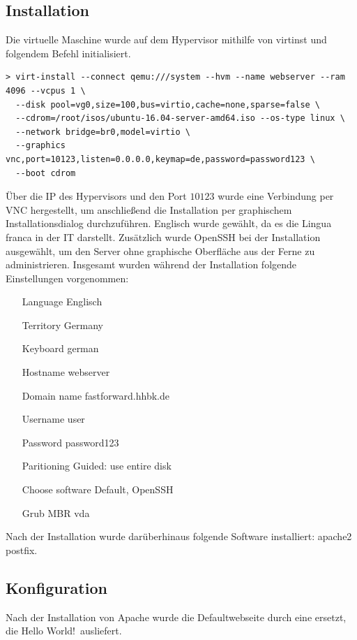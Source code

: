 \subsection{Installation}

Die virtuelle Maschine wurde auf dem Hypervisor mithilfe von {\sc virtinst} und folgendem Befehl initialisiert.

\begin{lstlisting}[numbers=none]
> virt-install --connect qemu:///system --hvm --name webserver --ram 4096 --vcpus 1 \
  --disk pool=vg0,size=100,bus=virtio,cache=none,sparse=false \
  --cdrom=/root/isos/ubuntu-16.04-server-amd64.iso --os-type linux \
  --network bridge=br0,model=virtio \
  --graphics vnc,port=10123,listen=0.0.0.0,keymap=de,password=password123 \
  --boot cdrom
\end{lstlisting}

Über die IP des Hypervisors und den Port $10123$ wurde eine Verbindung per VNC hergestellt, um anschließend die Installation per graphischem Installationsdialog durchzuführen. Englisch wurde gewählt, da es die Lingua franca in der IT darstellt. Zusätzlich wurde OpenSSH bei der Installation ausgewählt, um den Server ohne graphische Oberfläche aus der Ferne zu administrieren. Insgesamt wurden während der Installation folgende Einstellungen vorgenommen:
\begin{itemize}
	\item[Language] Englisch
	\item[Territory] Germany
	\item[Keyboard] german
	\item[Hostname] webserver
	\item[Domain name] fastforward.hhbk.de
	\item[Username] user
	\item[Password] password123
	\item[Paritioning] Guided: use entire disk
	\item[Choose software] Default, OpenSSH
	\item[Grub MBR] vda
\end{itemize}

Nach der Installation wurde darüberhinaus folgende Software installiert: {\sc apache2 postfix}.

\subsection{Konfiguration}

Nach der Installation von Apache wurde die Defaultwebseite durch eine ersetzt, die \ql Hello World!\qr\ ausliefert.

